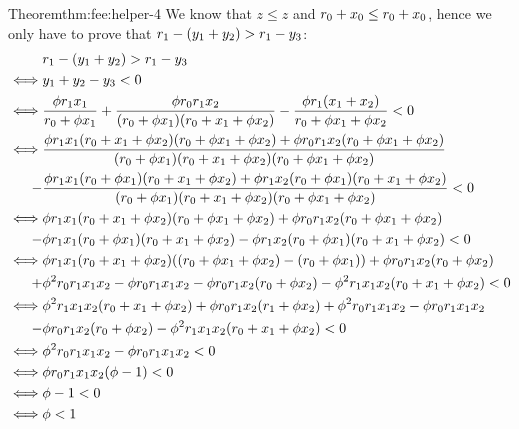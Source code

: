 \begin{proofof}{Theorem}{thm:fee:helper-4}
    We know that $z \leq z$ and $\ammR[0] + x_0 \leq \ammR[0] + x_0$, hence we only have to prove that $\ammR[1] - (y_1 + y_2) > \ammR[1] - y_3$:
    \begin{align*}
        & \ammR[1] - (y_1 + y_2) > \ammR[1] - y_3
        \\
        \iff & y_1 + y_2 - y_3 < 0
        \\
        \iff & \frac{\fee \ammR[1] x_1}{\ammR[0] + \fee x_1} + \frac{\fee \ammR[0] \ammR[1] x_2}{(\ammR[0] + \fee x_1)(\ammR[0] + x_1 + \fee x_2)}
        - \frac{\fee \ammR[1] (x_1 + x_2)}{\ammR[0] + \fee x_1 + \fee x_2} < 0
        \\
        \iff & \frac
            {\fee \ammR[1] x_1 (\ammR[0] + x_1 + \fee x_2)(\ammR[0] + \fee x_1 + \fee x_2) + \fee \ammR[0] \ammR[1] x_2 (\ammR[0] + \fee x_1 + \fee x_2)}
            {(\ammR[0] + \fee x_1)(\ammR[0] + x_1 + \fee x_2)(\ammR[0] + \fee x_1 + \fee x_2)}
            \\
            - & \frac{\fee \ammR[1] x_1 (\ammR[0] + \fee x_1)(\ammR[0] + x_1 + \fee x_2) + \fee \ammR[1] x_2 (\ammR[0] + \fee x_1)(\ammR[0] + x_1 + \fee x_2)}
            {(\ammR[0] + \fee x_1)(\ammR[0] + x_1 + \fee x_2)(\ammR[0] + \fee x_1 + \fee x_2)} < 0
        \\
        \iff & 
            \fee \ammR[1] x_1 (\ammR[0] + x_1 + \fee x_2)(\ammR[0] + \fee x_1 + \fee x_2) + \fee \ammR[0] \ammR[1] x_2 (\ammR[0] + \fee x_1 + \fee x_2) 
            \\
            - & \fee \ammR[1] x_1 (\ammR[0] + \fee x_1)(\ammR[0] + x_1 + \fee x_2) - \fee \ammR[1] x_2 (\ammR[0] + \fee x_1)(\ammR[0] + x_1 + \fee x_2) < 0
        \\
        \iff & 
            \fee \ammR[1] x_1 (\ammR[0] + x_1 + \fee x_2)((\ammR[0] + \fee x_1 + \fee x_2) - (\ammR[0] + \fee x_1)) + \fee \ammR[0] \ammR[1] x_2 (\ammR[0] + \fee x_2)
            \\
            + & \fee^2 \ammR[0] \ammR[1] x_1 x_2 - \fee \ammR[0] \ammR[1] x_1 x_2 - \fee \ammR[0] \ammR[1] x_2 (\ammR[0] + \fee x_2) - \fee^2 \ammR[1] x_1 x_2 (\ammR[0] + x_1 + \fee x_2) < 0
        \\
        \iff & 
            \fee^2 \ammR[1] x_1 x_2 (\ammR[0] + x_1 + \fee x_2) + \fee \ammR[0] \ammR[1] x_2 (\ammR[1] + \fee x_2) + \fee^2 \ammR[0] \ammR[1] x_1 x_2 - \fee \ammR[0] \ammR[1] x_1 x_2
            \\
            - & \fee \ammR[0] \ammR[1] x_2 (\ammR[0] + \fee x_2) - \fee^2 \ammR[1] x_1 x_2 (\ammR[0] + x_1 + \fee x_2) < 0
        \\
        \iff & 
            \fee^2 \ammR[0] \ammR[1] x_1 x_2 - \fee \ammR[0] \ammR[1] x_1 x_2 < 0
        \\
        \iff & 
            \fee \ammR[0] \ammR[1] x_1 x_2 (\fee - 1) < 0
        \\
        \iff &
            \fee - 1 < 0 
        \\
        \iff & \fee < 1
    \end{align*}
\end{proofof}

